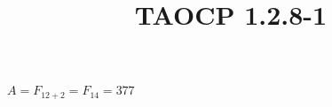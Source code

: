 \documentclass{article}
\title{TAOCP 1.2.8\mbox{-}1}
\begin{document}
\maketitle

\( A = F_{12+2} = F_{14} = 377 \)
\end{document}
